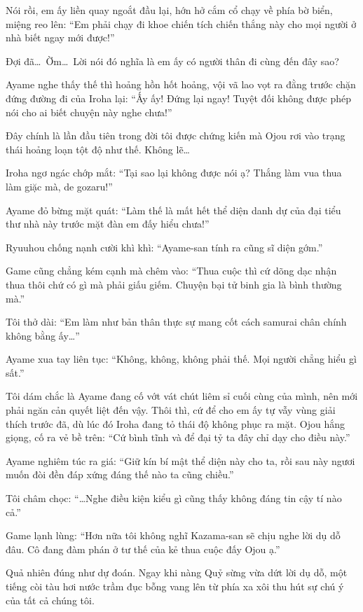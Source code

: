 \documentclass[../main.tex]{subfiles}
\begin{document}
Nói rồi, em ấy liền quay ngoắt đầu lại, hớn hở cắm cổ chạy về phía bờ biển, miệng reo lên: ``Em phải chạy đi khoe chiến tích chiến thắng này cho mọi người ở nhà biết ngay mới được!''

Đợi đã\dots\ Ờm\dots\ Lời nói đó nghĩa là em ấy có người thân đi cùng đến đây sao?

Ayame nghe thấy thế thì hoảng hồn hốt hoảng, vội vã lao vọt ra đằng trước chặn đứng đường đi của Iroha lại: ``Ấy ấy! Đứng lại ngay! Tuyệt đối không được phép nói cho ai biết chuyện này nghe chưa!''

Đây chính là lần đầu tiên trong đời tôi được chứng kiến mà Ojou rơi vào trạng thái hoảng loạn tột độ như thế. Không lẽ\dots

Iroha ngơ ngác chớp mắt: ``Tại sao lại không được nói ạ? Thắng làm vua thua làm giặc mà, de gozaru!''

Ayame đỏ bừng mặt quát: ``Làm thế là mất hết thể diện danh dự của đại tiểu thư nhà này trước mặt đàn em đấy hiểu chưa!''

Ryuuhou chống nạnh cười khì khì: ``Ayame-san tính ra cũng sĩ diện gớm.''

Game cũng chẳng kém cạnh mà chêm vào: ``Thua cuộc thì cứ dõng dạc nhận thua thôi chứ có gì mà phải giấu giếm. Chuyện bại tử binh gia là bình thường mà.''

Tôi thở dài: ``Em làm như bản thân thực sự mang cốt cách samurai chân chính không bằng ấy\dots''

Ayame xua tay liên tục: ``Không, không, không phải thế. Mọi người chẳng hiểu gì sất.''

Tôi dám chắc là Ayame đang cố vớt vát chút liêm sỉ cuối cùng của mình, nên mới phải ngăn cản quyết liệt đến vậy. Thôi thì, cứ để cho em ấy tự vẫy vùng giải thích trước đã, dù lúc đó Iroha đang tỏ thái độ không phục ra mặt. Ojou hắng giọng, cố ra vẻ bề trên: ``Cứ bình tĩnh và để đại tỷ ta đây chỉ dạy cho điều này.''

Ayame nghiêm túc ra giá: ``Giữ kín bí mật thể diện này cho ta, rồi sau này ngươi muốn đòi đền đáp xứng đáng thế nào ta cũng chiều.''

Tôi châm chọc: ``\dots Nghe điều kiện kiểu gì cũng thấy không đáng tin cậy tí nào cả.''

Game lạnh lùng: ``Hơn nữa tôi không nghĩ Kazama-san sẽ chịu nghe lời dụ dỗ đâu. Cô đang đàm phán ở tư thế của kẻ thua cuộc đấy Ojou ạ.''

Quả nhiên đúng như dự đoán. Ngay khi nàng Quỷ sừng vừa dứt lời dụ dỗ, một tiếng còi tàu hơi nước trầm đục bỗng vang lên từ phía xa xôi thu hút sự chú ý của tất cả chúng tôi.
\end{document}
